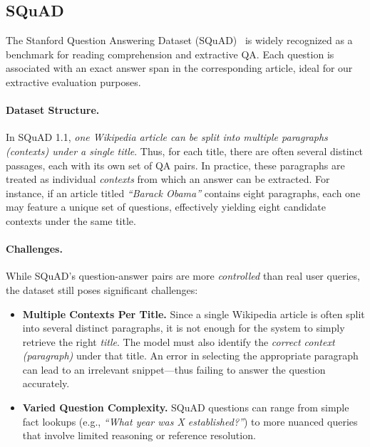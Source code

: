\subsection{SQuAD} The Stanford Question Answering Dataset (SQuAD)~\cite{squad1} is widely recognized as a benchmark for reading comprehension 
and extractive QA. 
Each question is associated with an exact answer span in the corresponding article, ideal for our extractive evaluation purposes.

\iffalse
\paragraph{Dataset Structure.}
In SQuAD 1.1, \emph{one Wikipedia article can be split into multiple paragraphs (contexts) under a single title}. 
Thus, for each title, there are often several distinct passages, each with its own set of QA pairs. 
In practice, these paragraphs are treated as individual \emph{contexts} from which an answer can be extracted. 
For instance, if an article titled \textit{``Barack Obama''} contains eight paragraphs, each one may feature 
a unique set of questions, effectively yielding eight candidate contexts under the same title.


\paragraph{Challenges.}
While SQuAD’s question-answer pairs are more \emph{controlled} than real user queries, 
the dataset still poses significant challenges:
\begin{itemize}
    \item \textbf{Multiple Contexts Per Title.} Since a single Wikipedia article is often split into 
    several distinct paragraphs, it is not enough for the system to simply retrieve the right \emph{title}. 
    The model must also identify the \emph{correct context (paragraph)} under that title. An error in selecting 
    the appropriate paragraph can lead to an irrelevant snippet—thus failing to answer the question accurately.
    \item \textbf{Varied Question Complexity.} SQuAD questions can range from simple fact lookups 
    (e.g., \emph{``What year was X established?''}) to more nuanced queries that involve limited 
    reasoning or reference resolution.
\end{itemize}

